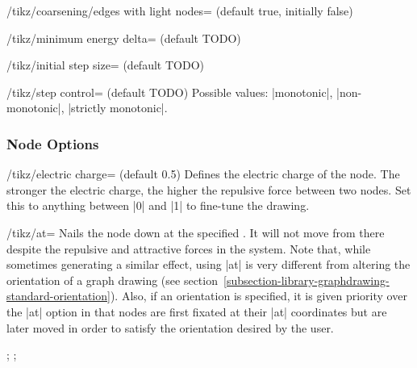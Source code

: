 \begin{key}{/tikz/coarsening/edges with light nodes=
  (default true, initially false)}
  \begin{codeexample}[]
  \end{codeexample}
\end{key}

\begin{key}{/tikz/minimum energy delta= (default TODO)}
  \begin{codeexample}[]
  \end{codeexample}
\end{key}

\begin{key}{/tikz/initial step size= (default TODO)}
  \begin{codeexample}[]
  \end{codeexample}
\end{key}

\begin{key}{/tikz/step control= (default TODO)}
  Possible values: |monotonic|, |non-monotonic|, |strictly monotonic|.
  \begin{codeexample}[]
  \end{codeexample}
\end{key}

\subsubsection{Node Options}

\begin{key}{/tikz/electric charge= (default 0.5)}
  Defines the electric charge of the node. The stronger the electric
  charge, the higher the repulsive force between two nodes. Set this to
  anything between |0| and |1| to fine-tune the drawing.
  \begin{codeexample}[] 
  \end{codeexample}
\end{key}

\begin{key}{/tikz/at=}
  Nails the node down at the specified . It will not
  move from there despite the repulsive and attractive forces in the
  system. Note that, while sometimes generating a similar effect, using
  |at| is very different from altering the orientation of a graph
  drawing (see section~\ref{subsection-library-graphdrawing-standard-orientation}).
  Also, if an orientation is specified, it is given priority over
  the |at| option in that nodes are first fixated at their |at|
  coordinates but are later moved in order to satisfy the orientation 
  desired by the user.
  \begin{codeexample}[width=6.0cm]
\tikz {};
\tikz {};
  \end{codeexample}
\end{key}


